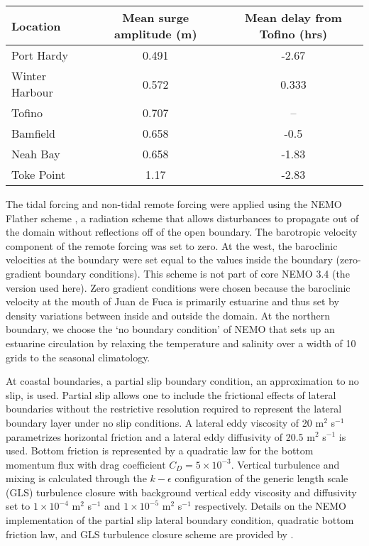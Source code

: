 \documentclass[letterpaper]{tATO2e}
\begin{document}
\begin{table}[h]
\centering 
{} 
{\begin{tabular}{|l |c | c|}
\hline 
Location & Mean surge amplitude (m) & Mean delay from Tofino (hrs) \\
\hline
Port Hardy & 0.491 & -2.67\\
Winter Harbour & 0.572 & 0.333 \\
Tofino  & 0.707 & -- \\
Bamfield & 0.658 & -0.5 \\
Neah Bay & 0.658 & -1.83 \\
Toke Point & 1.17 & -2.83 \\
\hline
\end{tabular}}
\label{tab:pacificsurge}
\end{table}


The tidal forcing and {\color{red} non-tidal} remote forcing were applied using the NEMO Flather scheme \citep{flather1994storm, madec2012nemo}, a radiation scheme that allows disturbances to propagate out of the domain without reflections off of the open boundary. The barotropic velocity component of the remote forcing was set to zero. At the west, the baroclinic velocities at the boundary were set equal to the values inside the boundary (zero-gradient boundary conditions).  This scheme is not part of core NEMO 3.4 (the version used here).  Zero gradient conditions were chosen because the baroclinic velocity at the mouth of Juan de Fuca is primarily estuarine and thus set by density variations between inside and outside the domain. {\color{red} At the northern boundary, we choose the `no boundary condition' of NEMO that sets up an estuarine circulation by relaxing the temperature and salinity over a width of 10 grids to the seasonal climatology. } 

At coastal boundaries, a partial slip boundary condition, an approximation to no slip, is used. Partial slip allows one to include the frictional effects of lateral boundaries without the restrictive resolution required to represent the lateral boundary layer under no slip conditions. A lateral eddy viscosity of 20 m$^2$ s$^{-1}$ parametrizes horizontal friction and a lateral eddy diffusivity of 20.5 m$^2$ s$^{-1}$ is used.  Bottom friction is represented by a quadratic law for the bottom momentum flux with drag coefficient $C_D = 5\times 10^{-3}$. Vertical turbulence and mixing is calculated through the $k-\epsilon$ configuration of the generic length scale (GLS) turbulence closure \citep{umlauf2003generic} with background vertical eddy viscosity and diffusivity set to $1\times10^{-4}$ m$^2$ s$^{-1}$ and $1\times10^{-5}$ m$^2$ s$^{-1}$ respectively. Details on the NEMO implementation of the partial slip lateral boundary condition, quadratic bottom friction law, and GLS turbulence closure scheme are provided by \citet{madec2012nemo}.
\end{document}
